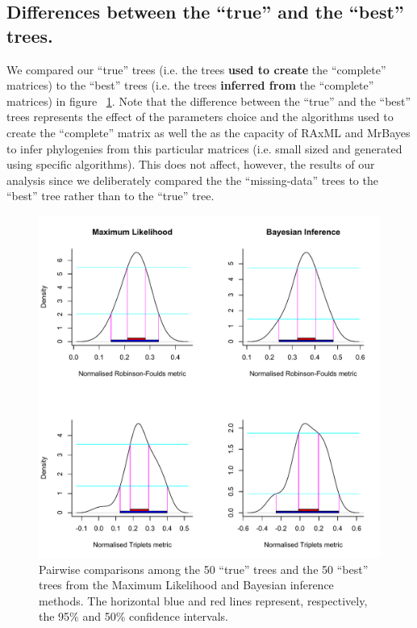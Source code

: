 \documentclass[12pt,letterpaper]{article}
\begin{document}
\subsection{Differences between the ``true'' and the ``best'' trees.}
We compared our ``true'' trees (i.e. the trees \textbf{used to create} the ``complete'' matrices) to the ``best'' trees (i.e. the trees \textbf{inferred from} %
 the ``complete'' matrices) in figure ~\ref{Fig_Supp_True_Best}.
Note that the difference between the ``true'' and the ``best'' trees represents the effect of the parameters choice and the algorithms used to create the ``complete'' matrix as well the as the capacity of RAxML and MrBayes to infer %
phylogenies from this particular matrices (i.e. small sized and generated using specific algorithms).
This does not affect, however, the results of our analysis since we deliberately compared the the ``missing-data'' trees to the ``best'' tree rather than to the ``true'' tree. 

\begin{figure} 
\centering
    \includegraphics[width=1\textwidth]{SupplementaryFigures/True_vs_Best_trees.pdf}
    \caption{Pairwise comparisons among the 50 ``true'' trees and the 50 ``best'' trees from the Maximum Likelihood and Bayesian inference methods. The horizontal blue and red lines represent, respectively, the 95\% and 50\% confidence intervals.} 
\label{Fig_Supp_True_Best} 
\end{figure}





\end{document}
